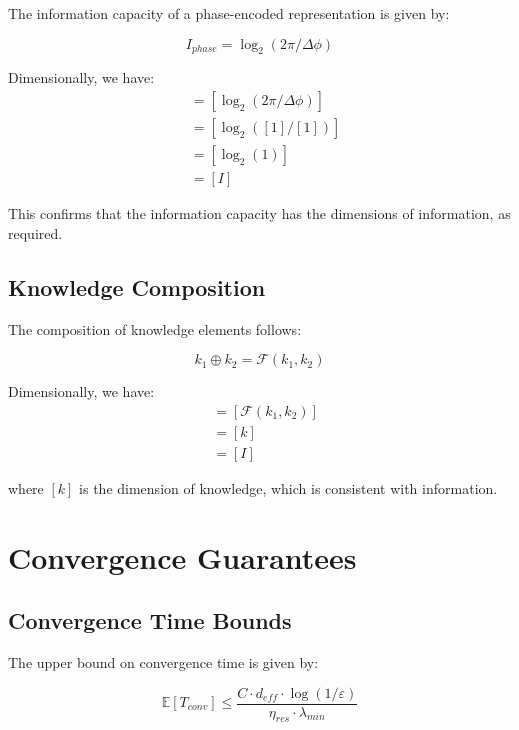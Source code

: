 The information capacity of a phase-encoded representation is given by:

\begin{equation}
I_{phase} = \log_2(2\pi / \Delta \phi)
\end{equation}

Dimensionally, we have:
\begin{align}
[I_{phase}] &= [\log_2(2\pi / \Delta \phi)] \\
&= [\log_2([1] / [1])] \\
&= [\log_2(1)] \\
&= [I]
\end{align}

This confirms that the information capacity has the dimensions of information, as required.

\subsection{Knowledge Composition}

The composition of knowledge elements follows:

\begin{equation}
k_1 \oplus k_2 = \mathcal{F}(k_1, k_2)
\end{equation}

Dimensionally, we have:
\begin{align}
[k_1 \oplus k_2] &= [\mathcal{F}(k_1, k_2)] \\
&= [k] \\
&= [I]
\end{align}

where $[k]$ is the dimension of knowledge, which is consistent with information.

\section{Convergence Guarantees}

\subsection{Convergence Time Bounds}

The upper bound on convergence time is given by:

\begin{equation}
\mathbb{E}[T_{conv}] \leq \frac{C \cdot d_{eff} \cdot \log(1/\varepsilon)}{\eta_{res} \cdot \lambda_{min}}
\end{equation}

